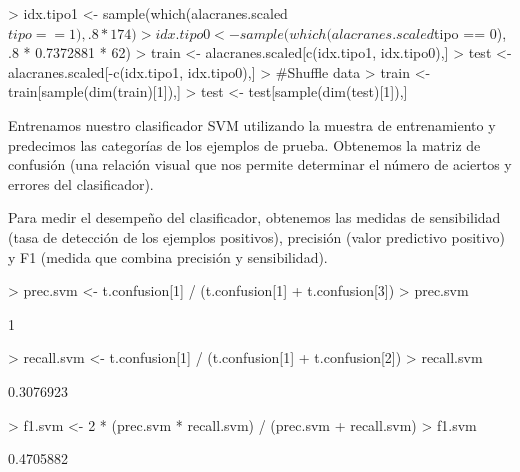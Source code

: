\documentclass[a4paper, 10pt]{article}
\begin{document}
\begin{Schunk}
\begin{Sinput}
> idx.tipo1 <- sample(which(alacranes.scaled$tipo == 1), .8 * 174)
> idx.tipo0 <- sample(which(alacranes.scaled$tipo == 0), .8 * 0.7372881 * 62)
> train <- alacranes.scaled[c(idx.tipo1, idx.tipo0),]
> test <- alacranes.scaled[-c(idx.tipo1, idx.tipo0),]
> #Shuffle data
> train <- train[sample(dim(train)[1]),]
> test <- test[sample(dim(test)[1]),]
\end{Sinput}
\end{Schunk}

Entrenamos nuestro clasificador SVM utilizando la muestra de entrenamiento y predecimos las categorías de los ejemplos de prueba. Obtenemos la matriz de confusión (una relación visual que nos permite determinar el número de aciertos y errores del clasificador).
\begin{Schunk}
\end{Schunk}

Para medir el desempeño del clasificador, obtenemos las medidas de sensibilidad (tasa de detección de los ejemplos positivos), precisión (valor predictivo positivo) y F1 (medida que combina precisión y sensibilidad).
\begin{Schunk}
\begin{Sinput}
> prec.svm <- t.confusion[1] / (t.confusion[1] + t.confusion[3])
> prec.svm
\end{Sinput}
\begin{Soutput}
[1] 1
\end{Soutput}
\begin{Sinput}
> recall.svm <- t.confusion[1] / (t.confusion[1] + t.confusion[2])
> recall.svm
\end{Sinput}
\begin{Soutput}
[1] 0.3076923
\end{Soutput}
\begin{Sinput}
> f1.svm <- 2 * (prec.svm * recall.svm) / (prec.svm + recall.svm)
> f1.svm
\end{Sinput}
\begin{Soutput}
[1] 0.4705882
\end{Soutput}
\end{Schunk}
\end{document}
